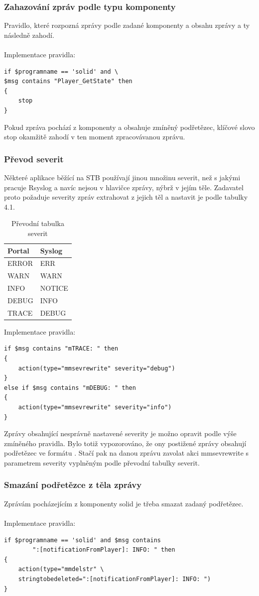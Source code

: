 \documentclass[thesis=B,czech]{FITthesis}[2012/06/26]
\begin{document}
\subsubsection{Zahazování zpráv podle typu komponenty}
Pravidlo, které rozpozná zprávy podle zadané komponenty a obsahu zprávy a ty následně zahodí.
\\
\\
Implementace pravidla:
\begin{lstlisting}[style=RainerScriptStyle]
if $programname == 'solid' and \
$msg contains "Player_GetState" then
{	
	stop
}
\end{lstlisting}
Pokud zpráva pochází z komponenty  a obsahuje zmíněný podřetězec, klíčové slovo stop okamžitě zahodí v ten moment zpracovávanou zprávu.
\\
\subsubsection{Převod severit}
Některé aplikace běžící na STB používají jinou množinu severit, než s jakými pracuje Rsyslog a navíc nejsou v hlavičce zprávy, nýbrž v jejím těle.
Zadavatel proto požaduje severity zpráv extrahovat z jejich těl a nastavit je podle tabulky 4.1.

\begin{table}[H]
\centering
	\caption{Převodní tabulka severit}	\begin{tabular}{|l|l|}\hline
		Portal		& Syslog			\tabularnewline \hline \hline
		ERROR		& ERR			\tabularnewline \hline
		WARN		& WARN			\tabularnewline \hline
		INFO		& NOTICE			\tabularnewline \hline
		DEBUG		& INFO			\tabularnewline \hline
		TRACE		& DEBUG			\tabularnewline \hline
	\end{tabular}
\end{table}
Implementace pravidla:
\begin{lstlisting}[style=RainerScriptStyle]
if $msg contains "mTRACE: " then
{
	action(type="mmsevrewrite" severity="debug")
}
else if $msg contains "mDEBUG: " then
{
	action(type="mmsevrewrite" severity="info")
}
\end{lstlisting}
Zprávy obsahující nesprávně nastavené severity je možno opravit podle výše zmíněného pravidla. Bylo totiž vypozorováno, že ony postižené zprávy obsahují podřetězec ve formátu . Stačí pak na danou zprávu zavolat akci mmsevrewrite s parametrem severity vyplněným podle převodní tabulky severit.

\subsubsection{Smazání podřetězce z těla zprávy}
Zprávám pocházejícím z komponenty solid je třeba smazat zadaný podřetězec.
\\
\\
Implementace pravidla:
\begin{lstlisting}[style=RainerScriptStyle]
if $programname == 'solid' and $msg contains
		":[notificationFromPlayer]: INFO: " then
{
	action(type="mmdelstr" \ 
	stringtobedeleted=":[notificationFromPlayer]: INFO: ")
}
\end{lstlisting}
\end{document}
